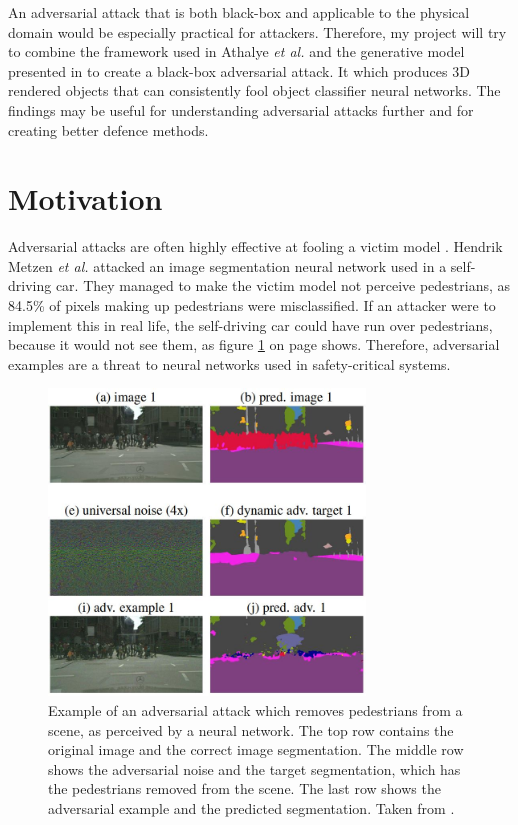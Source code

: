 An adversarial attack that is both black-box and applicable to the physical domain would be especially practical for attackers. Therefore, my project will try to combine the framework used in Athalye \textit{et al.} \cite{athalye} and the generative model presented in \cite{zheng_black_box_GAN} to create a black-box adversarial attack. It which produces 3D rendered objects that can consistently fool object classifier neural networks. The findings may be useful for understanding adversarial attacks further and for creating better defence methods.

\section{Motivation}
    \label{sec:motivation}
	
Adversarial attacks are often highly effective at fooling a victim model \cite{akhtar, silva_survey, dong2020benchmarking, robustart, fgsm}. Hendrik Metzen \textit{et al.} \cite{Metzen_2017_ICCV} attacked an image segmentation neural network used in a self-driving car. They managed to make the victim model not perceive pedestrians, as 84.5\% of pixels making up pedestrians were misclassified. If an attacker were to implement this in real life, the self-driving car could have run over pedestrians, because it would not see them, as figure \ref{fig:adversarial_segmentation} on page \pageref{fig:adversarial_segmentation} shows. Therefore, adversarial examples are a threat to neural networks used in safety-critical systems.

\begin{figure}[ht]
    \centering
    \includegraphics[width=0.75\textwidth]{graphics/adversarial_segmentation.JPG}
    \caption[Example of an adversarial example against neural network used in self-driving car.]{Example of an adversarial attack which removes pedestrians from a scene, as perceived by a neural network. The top row contains the original image and the correct image segmentation. The middle row shows the adversarial noise and the target segmentation, which has the pedestrians removed from the scene. The last row shows the adversarial example and the predicted segmentation. Taken from \cite{Metzen_2017_ICCV}.}
    \label{fig:adversarial_segmentation}
\end{figure}

